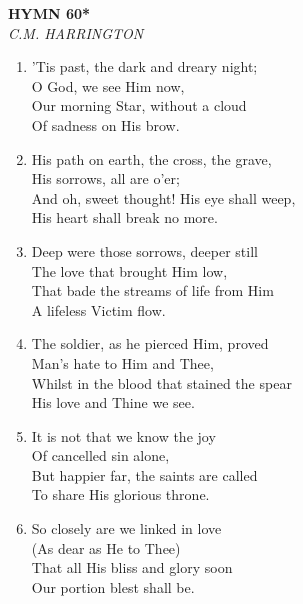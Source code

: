 \newpage
\begin{center}
    {\Large \textbf{HYMN 60*}}
    \\
    \textit{C.M. HARRINGTON}
\end{center}
\vspace{1em}

\begin{enumerate}
    \item 'Tis past, the dark and dreary night; \\
        O God, we see Him now, \\
        Our morning Star, without a cloud \\
        Of sadness on His brow.

    \item His path on earth, the cross, the grave, \\
        His sorrows, all are o'er; \\
        And oh, sweet thought! His eye shall weep, \\
        His heart shall break no more.

    \item Deep were those sorrows, deeper still \\
        The love that brought Him low, \\
        That bade the streams of life from Him \\
        A lifeless Victim flow.

    \item The soldier, as he pierced Him, proved \\
        Man's hate to Him and Thee, \\
        Whilst in the blood that stained the spear \\
        His love and Thine we see.

    \item It is not that we know the joy \\
        Of cancelled sin alone, \\
        But happier far, the saints are called \\
        To share His glorious throne.

    \item So closely are we linked in love \\
        (As dear as He to Thee) \\
        That all His bliss and glory soon \\
        Our portion blest shall be.

\end{enumerate}

